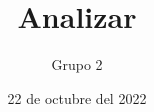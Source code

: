 \documentclass[11pt,openright,final]{unsa}
\title{Analizar }
\author{Grupo 2}%
\date{22 de octubre del 2022}
\begin{document}
\makeFirstCover \makeSecondCover %
\begin{frontmatter}

\approved{\cuatro}%

\dedicatory
\begin{singlespace}
\tableofcontents \listoffigures \listoftables \pagebreak
\end{singlespace}
%
%
%
\end{frontmatter}%
\pagestyle{fancyplain}





\begin{singlespace}
\end{singlespace}
\end{document}
